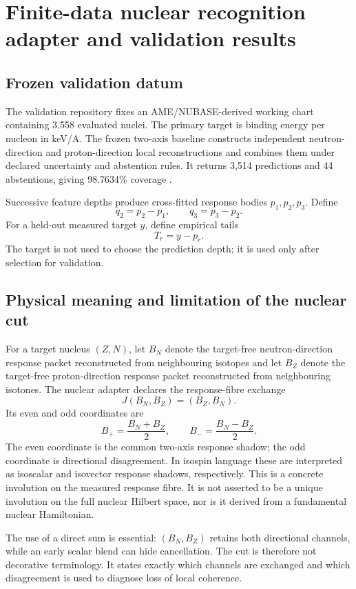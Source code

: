\section{Finite-data nuclear recognition adapter and validation results}

\subsection{Frozen validation datum}

The validation repository fixes an AME/NUBASE-derived working chart containing 3,558 evaluated nuclei. The primary target is binding energy per nucleon in keV/A. The frozen two-axis baseline constructs independent neutron-direction and proton-direction local reconstructions and combines them under declared uncertainty and abstention rules. It returns 3,514 predictions and 44 abstentions, giving 98.7634\% coverage \cite{atomicRelease,uamDraft}.

Successive feature depths produce cross-fitted response bodies $p_1,p_2,p_3$. Define
\[
 q_2=p_2-p_1,
 \qquad
 q_3=p_3-p_2.
\]
For a held-out measured target $y$, define empirical tails
\[
 T_r=y-p_r.
\]
The target is not used to choose the prediction depth; it is used only after selection for validation.

\subsection{Physical meaning and limitation of the nuclear cut}

For a target nucleus $(Z,N)$, let $B_N$ denote the target-free neutron-direction response packet reconstructed from neighbouring isotopes and let $B_Z$ denote the target-free proton-direction response packet reconstructed from neighbouring isotones. The nuclear adapter declares the response-fibre exchange
\[
 \boxed{J(B_N,B_Z)=(B_Z,B_N).}
\]
Its even and odd coordinates are
\[
 B_+=\frac{B_N+B_Z}{2},
 \qquad
 B_-=\frac{B_N-B_Z}{2}.
\]
The even coordinate is the common two-axis response shadow; the odd coordinate is directional disagreement. In isospin language these are interpreted as isoscalar and isovector response shadows, respectively. This is a concrete involution on the measured response fibre. It is not asserted to be a unique involution on the full nuclear Hilbert space, nor is it derived from a fundamental nuclear Hamiltonian.

The use of a direct sum is essential: $(B_N,B_Z)$ retains both directional channels, while an early scalar blend can hide cancellation. The cut is therefore not decorative terminology. It states exactly which channels are exchanged and which disagreement is used to diagnose loss of local coherence.

